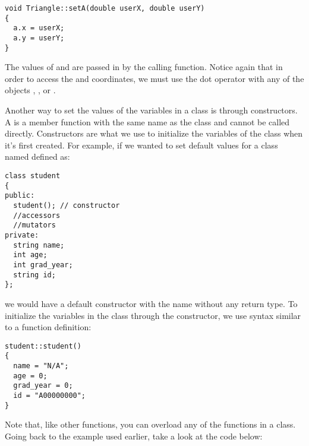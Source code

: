\noindent\begin{minipage}{\linewidth}\begin{lstlisting}
void Triangle::setA(double userX, double userY)
{
  a.x = userX;
  a.y = userY;
}
\end{lstlisting}\end{minipage}

The values of  and  are passed in by the calling function. 
Notice again that in order to access the  and  coordinates, we must use the dot operator with any of the  objects , , or .



Another way to set the values of the variables in a class is through constructors. 
A  is a member function with the same name as the class and cannot be called directly. 
Constructors are what we use to initialize the variables of the class when it's first created. 
For example, if we wanted to set default values for a class named  defined as: 

\noindent\begin{minipage}{\linewidth}\begin{lstlisting}
class student
{
public:
  student(); // constructor
  //accessors
  //mutators
private:
  string name;
  int age;
  int grad_year;
  string id;
};
\end{lstlisting}\end{minipage}

\noindent we would have a default constructor with the name  without any return type. 
To initialize the variables in the class through the constructor, we use syntax similar to a function definition:

\noindent\begin{minipage}{\linewidth}\begin{lstlisting}
student::student()
{
  name = "N/A";
  age = 0;
  grad_year = 0;
  id = "A00000000";
}
\end{lstlisting}\end{minipage}


Note that, like other functions, you can overload any of the functions in a class. 
Going back to the  example used earlier, take a look at the code below: \nopagebreak[4]

